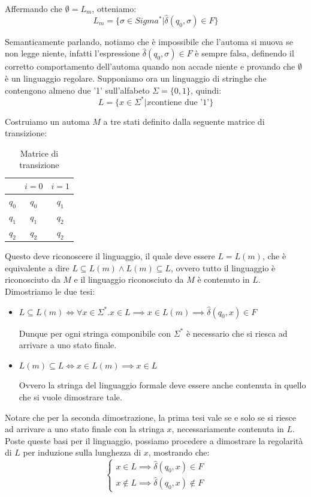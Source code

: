 \noindent Affermando che $\emptyset = L_m$, otteniamo: \[
    L_m = \{\sigma\in Sigma^* | \hat{\delta}(q_0, \sigma)\in F\}
\]

\noindent Semanticamente parlando, notiamo che è impossibile che l'automa si muova se non legge niente, infatti l'espressione $\hat{\delta}(q_0, \sigma)
\in F$ è sempre falsa, definendo il corretto comportamento dell'automa quando non accade niente e provando che $\emptyset$ è un linguaggio regolare.
Supponiamo ora un linguaggio di stringhe che contengono almeno due '1' sull'alfabeto $\Sigma = \{0,1\}$, quindi: \[
    L = \{x\in \Sigma^* | x \text{contiene due '1'}\}
\]

\noindent Costruiamo un automa $M$ a tre stati definito dalla seguente matrice di transizione: \begin{table}[h]
	\centering
	\begin{tabular}{c|c|c|}
		& $i=0$ & $i=1$\\
		\hline
		$q_0$ & $q_0$ & $q_1$\\
		\hline
		$q_1$ & $q_1$ & $q_2$\\
		\hline
		$q_2$ & $q_2$ & $q_2$\\
		\hline
	\end{tabular}
	\caption{Matrice di transizione}
\end{table}

\noindent Questo deve riconoscere il linguaggio, il quale deve essere $L = L(m)$, che è equivalente a dire $L \subseteq L(m) \land L(m) \subseteq L$,
ovvero tutto il linguaggio è riconosciuto da $M$ e il linguaggio riconosciuto da $M$ è contenuto in $L$. Dimostriamo le due tesi: \begin{itemize}
    \item $L \subseteq L(m) \iff \forall x\in \Sigma^{*}.x\in L \implies x\in L(m) \implies \hat{\delta}(q_0, x)\in F$\par
    Dunque per ogni stringa componibile con $\Sigma^*$ è necessario che si riesca ad arrivare a uno stato finale.
    \item $L(m) \subseteq L \iff x\in L(m) \implies x\in L$\par
    Ovvero la stringa del linguaggio formale deve essere anche contenuta in quello che si vuole dimostrare tale.
\end{itemize}

\noindent Notare che per la seconda dimostrazione, la prima tesi vale se e solo se si riesce ad arrivare a uno stato finale con la stringa $x$,
necessariamente contenuta in $L$. Poste queste basi per il linguaggio, possiamo procedere a dimostrare la regolarità di $L$ per induzione sulla
lunghezza di $x$, mostrando che: \[ \begin{cases}
    x\in L \implies \hat{\delta}(q_0, x)\in F\\
    x\notin L \implies \hat{\delta}(q_0, x)\notin F
\end{cases} \]

